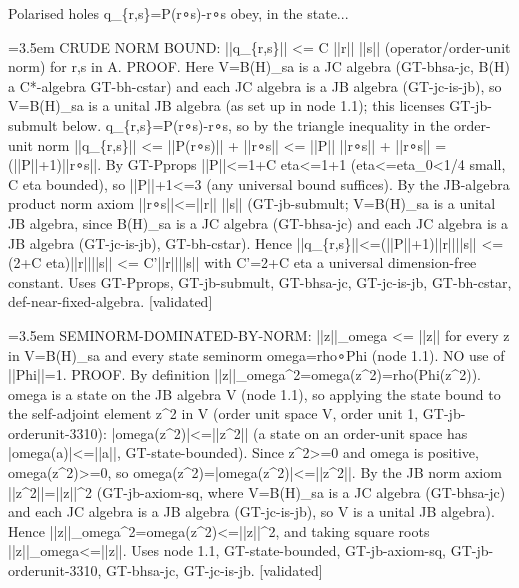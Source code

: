 \documentclass{article}
\newcommand{\step}[1]{\par\noindent\hangindent=3.5em\hangafter=1%
  \makebox[3.5em][l]{\textbf{#1.}}}
\newcommand{\steptag}[1]{\hfill{\small\textsf{[#1]}}}
\begin{document}
\begin{proofbox}{Polarised holes q\_\{r,s\}=P(r∘s)-r∘s obey, in the state...}
\step{1.3} CRUDE NORM BOUND: ||q\_\{r,s\}|| <= C ||r|| ||s|| (operator/order-unit norm) for r,s in A. PROOF. Here V=B(H)\_sa is a JC algebra (GT-bhsa-jc, B(H) a C*-algebra GT-bh-cstar) and each JC algebra is a JB algebra (GT-jc-is-jb), so V=B(H)\_sa is a unital JB algebra (as set up in node 1.1); this licenses GT-jb-submult below. q\_\{r,s\}=P(r∘s)-r∘s, so by the triangle inequality in the order-unit norm ||q\_\{r,s\}|| <= ||P(r∘s)|| + ||r∘s|| <= ||P|| ||r∘s|| + ||r∘s|| = (||P||+1)||r∘s||. By GT-Pprops ||P||<=1+C eta<=1+1 (eta<=eta\_0<1/4 small, C eta bounded), so ||P||+1<=3 (any universal bound suffices). By the JB-algebra product norm axiom ||r∘s||<=||r|| ||s|| (GT-jb-submult; V=B(H)\_sa is a unital JB algebra, since B(H)\_sa is a JC algebra (GT-bhsa-jc) and each JC algebra is a JB algebra (GT-jc-is-jb), GT-bh-cstar). Hence ||q\_\{r,s\}||<=(||P||+1)||r||||s|| <= (2+C eta)||r||||s|| <= C'||r||||s|| with C'=2+C eta a universal dimension-free constant. Uses GT-Pprops, GT-jb-submult, GT-bhsa-jc, GT-jc-is-jb, GT-bh-cstar, def-near-fixed-algebra. \steptag{validated} \\[6pt]
\step{1.3.1} SEMINORM-DOMINATED-BY-NORM: ||z||\_omega <= ||z|| for every z in V=B(H)\_sa and every state seminorm omega=rho∘Phi (node 1.1). NO use of ||Phi||=1. PROOF. By definition ||z||\_omega\textasciicircum{}2=omega(z\textasciicircum{}2)=rho(Phi(z\textasciicircum{}2)). omega is a state on the JB algebra V (node 1.1), so applying the state bound to the self-adjoint element z\textasciicircum{}2 in V (order unit space V, order unit 1, GT-jb-orderunit-3310): |omega(z\textasciicircum{}2)|<=||z\textasciicircum{}2|| (a state on an order-unit space has |omega(a)|<=||a||, GT-state-bounded). Since z\textasciicircum{}2>=0 and omega is positive, omega(z\textasciicircum{}2)>=0, so omega(z\textasciicircum{}2)=|omega(z\textasciicircum{}2)|<=||z\textasciicircum{}2||. By the JB norm axiom ||z\textasciicircum{}2||=||z||\textasciicircum{}2 (GT-jb-axiom-sq, where V=B(H)\_sa is a JC algebra (GT-bhsa-jc) and each JC algebra is a JB algebra (GT-jc-is-jb), so V is a unital JB algebra). Hence ||z||\_omega\textasciicircum{}2=omega(z\textasciicircum{}2)<=||z||\textasciicircum{}2, and taking square roots ||z||\_omega<=||z||. Uses node 1.1, GT-state-bounded, GT-jb-axiom-sq, GT-jb-orderunit-3310, GT-bhsa-jc, GT-jc-is-jb. \steptag{validated} \\[4pt]

\end{proofbox}
\end{document}
